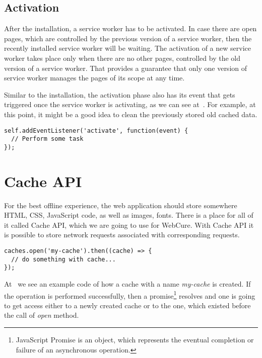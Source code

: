 \subsection*{Activation}

After the installation, a service worker has to be activated. In case there are open pages, which are controlled by the previous version of a service worker, then the recently installed service worker will be waiting. The activation of a new service worker takes place only when there are no other pages, controlled by the old version of a service worker. That provides a guarantee that only one version of service worker manages the pages of its scope at any time.

Similar to the installation, the activation phase also has its event that gets triggered once the service worker is activating, as we can see at~. For example, at this point, it might be a good idea to clean the previously stored old cached data.

\begin{lstlisting}[caption={[Code for listening to activation of a Service Worker]Code, which demonstates a listener for the \textit{activation} service worker's event\cite{32}.}, label={lst:tech4}]
self.addEventListener('activate', function(event) {
  // Perform some task
});
\end{lstlisting}

\section{Cache API}
\label{CacheAPI}

For the best offline experience, the web application should store somewhere HTML, CSS, JavaScript code, as well as images, fonts. There is a place for all of it called Cache API, which we are going to use for WebCure. With Cache API it is possible to store network requests associated with corresponding requests.

\begin{lstlisting}[caption={[Code for creating a cache storage using Cache API]Code, which demonstrates how one can create cache storage called \textit{my-cache}\cite{34}.}, label={lst:tech6}]
caches.open('my-cache').then((cache) => {
  // do something with cache...
});
\end{lstlisting}

At~ we see an example code of how a cache with a name \textit{my-cache} is created. If the operation is performed successfully, then a promise\footnote{JavaScript Promise is an object, which represents the eventual completion or failure of an asynchronous operation\cite{37}.} resolves and one is going to get access either to a newly created cache or to the one, which existed before the call of \textit{open} method.

